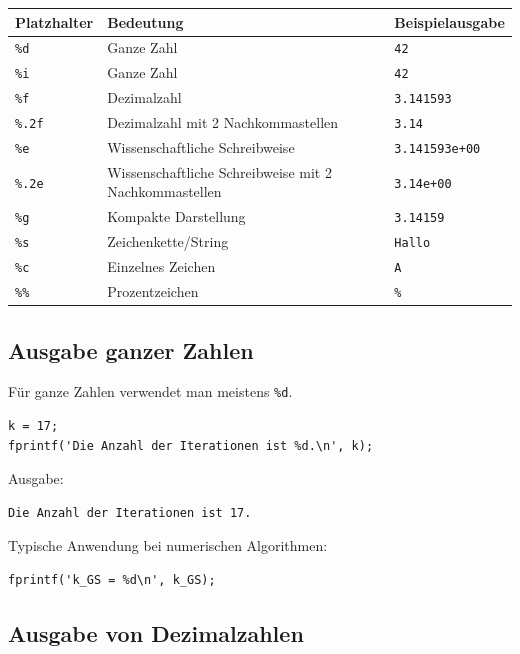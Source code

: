 \documentclass[10pt, letterpaper]{article}
\begin{document}
\begin{center}
\begin{tabular}{lll}
\hline
Platzhalter & Bedeutung & Beispielausgabe \\
\hline
\texttt{\%d} & Ganze Zahl & \texttt{42} \\
\texttt{\%i} & Ganze Zahl & \texttt{42} \\
\texttt{\%f} & Dezimalzahl & \texttt{3.141593} \\
\texttt{\%.2f} & Dezimalzahl mit 2 Nachkommastellen & \texttt{3.14} \\
\texttt{\%e} & Wissenschaftliche Schreibweise & \texttt{3.141593e+00} \\
\texttt{\%.2e} & Wissenschaftliche Schreibweise mit 2 Nachkommastellen & \texttt{3.14e+00} \\
\texttt{\%g} & Kompakte Darstellung & \texttt{3.14159} \\
\texttt{\%s} & Zeichenkette/String & \texttt{Hallo} \\
\texttt{\%c} & Einzelnes Zeichen & \texttt{A} \\
\texttt{\%\%} & Prozentzeichen & \texttt{\%} \\
\hline
\end{tabular}
\end{center}

\subsection{Ausgabe ganzer Zahlen}

Für ganze Zahlen verwendet man meistens \texttt{\%d}.

\begin{verbatim}
k = 17;
fprintf('Die Anzahl der Iterationen ist %d.\n', k);
\end{verbatim}

Ausgabe:

\begin{verbatim}
Die Anzahl der Iterationen ist 17.
\end{verbatim}

Typische Anwendung bei numerischen Algorithmen:

\begin{verbatim}
fprintf('k_GS = %d\n', k_GS);
\end{verbatim}

\subsection{Ausgabe von Dezimalzahlen}
\end{document}
